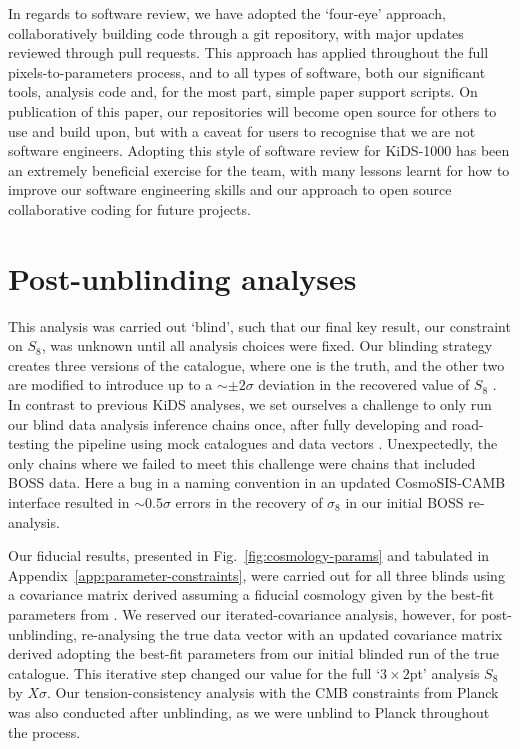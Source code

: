\begin{appendix}
In regards to software review, we have adopted the `four-eye' approach, collaboratively building code through a git repository, with major updates reviewed through pull requests.   This approach has applied throughout the full pixels-to-parameters process, and to all types of software, both our significant tools, analysis code and, for the most part, simple paper support scripts.  On publication of this paper, our repositories will become open source for others to use and build upon, but with a caveat for users to recognise that we are not software engineers.   Adopting this style of software review for KiDS-1000 has been an extremely beneficial exercise for the team, with many lessons learnt for how to improve our software engineering skills and our approach to open source collaborative coding for future projects.     

\section{Post-unblinding analyses}
\label{app:unblinding}
This analysis was carried out `blind',  such that our final key result, our constraint on $S_8$, was unknown until all analysis choices were fixed.   Our blinding strategy creates three versions of the catalogue, where one is the truth, and the other two are modified to introduce up to a $\sim \pm 2\sigma$ deviation in the recovered value of $S_8$ \citep{kuijken/etal:2015, giblin/etal:inprep}.   In contrast to previous KiDS analyses, we set ourselves a challenge to only run our blind data analysis inference chains once, after fully developing and road-testing the pipeline using mock catalogues and data vectors \citep{joachimi/etal:inprep}.     Unexpectedly, the only chains where we failed to meet this challenge were chains that included BOSS data.   Here a bug in a naming convention in an updated {\sc CosmoSIS-CAMB} interface resulted in $\sim 0.5\sigma$ errors in the recovery of $\sigma_8$ in our initial BOSS re-analysis.

Our fiducial results, presented in Fig.~\ref{fig:cosmology-params} and tabulated in Appendix~\ref{app:parameter-constraints}, were carried out for all three blinds using a covariance matrix derived assuming a fiducial cosmology given by the best-fit parameters from \citet{troester/etal:2020}.  We reserved our iterated-covariance analysis, however, for post-unblinding, re-analysing the true data vector with an updated covariance matrix derived adopting the best-fit parameters from our initial blinded run of the true catalogue.   This iterative step changed our value for the full `$3\times2$pt' analysis $S_8$ by $X\sigma$.   Our tension-consistency analysis with the CMB constraints from Planck was also conducted after unblinding, as we were unblind to Planck throughout the process.


\end{appendix}
